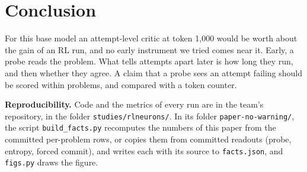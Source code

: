 \documentclass[10pt]{article}
\begin{document}
\section{Conclusion}

For this base model an attempt-level critic at token 1{,}000 would be worth about the gain of an RL run, and no
early instrument we tried comes near it. Early, a probe reads the problem. What tells attempts apart later is
how long they run, and then whether they agree. A claim that a probe sees an attempt failing should be scored
within problems, and compared with a token counter.

{\small
\textbf{Reproducibility.} Code and the metrics of every run are in the team's repository, in the folder
\texttt{studies/rlneurons/}. In its folder \texttt{paper-no-warning/}, the script \texttt{build\_facts.py}
recomputes the numbers of this paper from the committed per-problem rows, or copies them from committed readouts
(probe, entropy, forced commit), and writes each with its source to
\texttt{facts.json}, and \texttt{figs.py} draws the figure.
}

{\small


}
\end{document}
